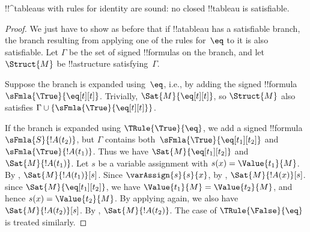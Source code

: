   



\begin{prop}
!!^{tableau}s with rules for identity are sound: no closed !!{tableau}
  is satisfiable.
\end{prop}

\begin{proof}
We just have to show as before that if !!a{tableau} has a satisfiable
branch, the branch resulting from applying one of the rules for~$\eq$
to it is also satisfiable. Let $\Gamma$ be the set of signed
!!{formula}s on the branch, and let $\Struct{M}$ be !!a{structure}
satisfying~$\Gamma$.

Suppose the branch is expanded using~$\eq$, i.e., by adding the signed
!!{formula}~$\sFmla{\True}{\eq[t][t]}$. Trivially,
$\Sat{M}{\eq[t][t]}$, so $\Struct{M}$ also satisfies $\Gamma \cup
\{\sFmla{\True}{\eq[t][t]}\}$.

If the branch is expanded using $\TRule{\True}{\eq}$, we add a signed
!!{formula}~$\sFmla{S}{!A(t_2)}$, but $\Gamma$ contains
both~$\sFmla{\True}{\eq[t_1][t_2]}$ and $\sFmla{\True}{!A(t_1)}$. Thus
we have $\Sat{M}{\eq[t_1][t_2]}$ and $\Sat{M}{!A(t_1)}$. Let $s$ be a
variable assignment with $s(x) = \Value{t_1}{M}$.  By
, $\Sat{M}{!A(t_1)}[s]$. Since
$\varAssign{s}{s}{x}$, by ,
$\Sat{M}{!A(x)}[s]$. since $\Sat{M}{\eq[t_1][t_2]}$, we have
$\Value{t_1}{M} = \Value{t_2}{M}$, and hence $s(x) = \Value{t_2}{M}$.
By applying  again, we also have
$\Sat{M}{!A(t_2)}[s]$.  By ,
$\Sat{M}{!A(t_2)}$. The case of $\TRule{\False}{\eq}$ is treated
similarly.
\end{proof}




\OLEndChapterHook





  

